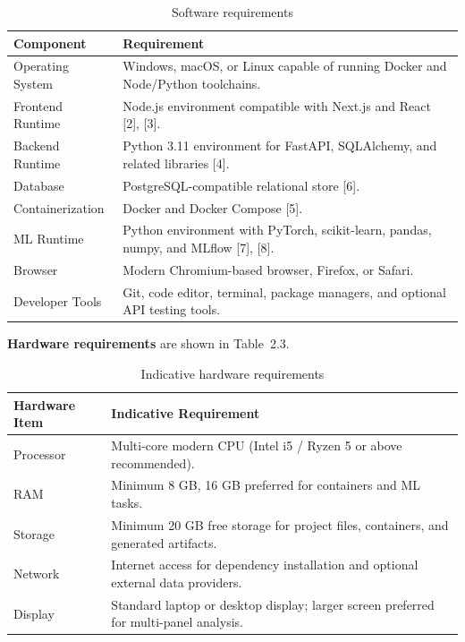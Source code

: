 \documentclass[12pt,a4paper]{report}
\begin{document}
\begin{table}[H]
\centering
\caption{Software requirements}
\begin{tabularx}{\textwidth}{>{\raggedright\arraybackslash}p{2.2in} X}
\toprule
\textbf{Component} & \textbf{Requirement} \\
\midrule
Operating System & Windows, macOS, or Linux capable of running Docker and Node/Python toolchains. \\
Frontend Runtime & Node.js environment compatible with Next.js and React [2], [3]. \\
Backend Runtime & Python 3.11 environment for FastAPI, SQLAlchemy, and related libraries [4]. \\
Database & PostgreSQL-compatible relational store [6]. \\
Containerization & Docker and Docker Compose [5]. \\
ML Runtime & Python environment with PyTorch, scikit-learn, pandas, numpy, and MLflow [7], [8]. \\
Browser & Modern Chromium-based browser, Firefox, or Safari. \\
Developer Tools & Git, code editor, terminal, package managers, and optional API testing tools. \\
\bottomrule
\end{tabularx}
\end{table}

\textbf{Hardware requirements} are shown in Table~2.3.

\begin{table}[H]
\centering
\caption{Indicative hardware requirements}
\begin{tabularx}{\textwidth}{>{\raggedright\arraybackslash}p{2.2in} X}
\toprule
\textbf{Hardware Item} & \textbf{Indicative Requirement} \\
\midrule
Processor & Multi-core modern CPU (Intel i5 / Ryzen 5 or above recommended). \\
RAM & Minimum 8 GB, 16 GB preferred for containers and ML tasks. \\
Storage & Minimum 20 GB free storage for project files, containers, and generated artifacts. \\
Network & Internet access for dependency installation and optional external data providers. \\
Display & Standard laptop or desktop display; larger screen preferred for multi-panel analysis. \\
\bottomrule
\end{tabularx}
\end{table}
\end{document}

